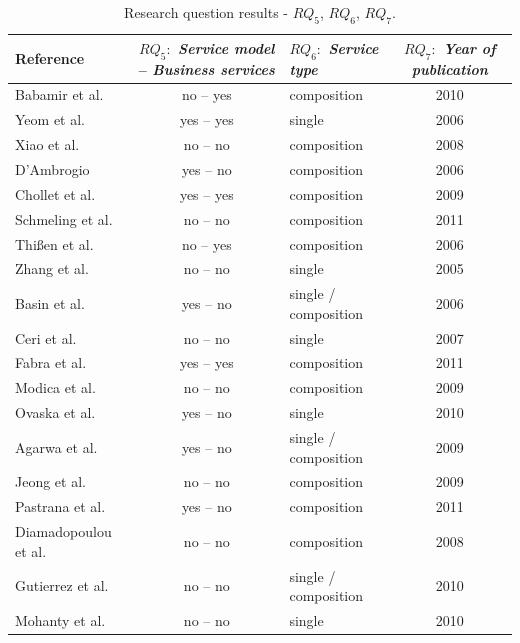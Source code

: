 \begin{table}[ht!]
\centering
\scriptsize
\begin{tabular}{l|c|l|c}
  \hline 
  \hline
   \textbf{Reference} & $RQ_5:$ \textbf{\textit{Service model}} --
   \textbf{\textit{Business services}} &
$RQ_6:$ \textbf{\textit{Service type}} &   $RQ_7:$ \textbf{\textit{Year of publication}} 
   \\
  \hline
  \hline  
  Babamir et al. \cite{Babamir2010} & no -- yes  & composition & 2010   
 \\  
  \hline   
  Yeom et al. \cite{Yeom2006} & yes -- yes & single   & 2006  \\  \hline
  Xiao et al. \cite{XiaoCZBOLH08} & no -- no & composition    & 2008
   \\ 
  \hline 
  D'Ambrogio \cite{DAmbrogio06} & yes  -- no & composition  & 2006 \\
   \hline
  Chollet et al. \cite{CholletL09} & yes -- yes & composition  &  2009 \\
  \hline 
  Schmeling et al. \cite{SchmelingCM11} & no -- no & composition &  2011 \\ 
  \hline
   Thi{\ss}en et al. \cite{ThissenW06} & no -- yes & composition & 2006
   \\
  \hline
  Zhang et al. \cite{ZhangPSP05} & no -- no  & single  & 2005 \\ 
  \hline
  Basin et al. \cite{BasinDL06} & yes -- no & single / composition  & 
  2006\\
  \hline 
  Ceri et al. \cite{CeriDMF07} & no -- no  & single  &  2007\\ 
  \hline 
  Fabra et al. \cite{Fabra2011} & yes -- yes & composition  &  2011\\
  \hline
  Modica et al. \cite{ModicaTV09} & no -- no & composition & 2009\\ 
  \hline
  Ovaska et al. \cite{OvaskaEHPA10} & yes -- no & single & 2010\\
  \hline
  Agarwa et al. \cite{AgarwalLS09} & yes -- no & single / composition  &  
  2009\\
  \hline
  Jeong et al. \cite{JeongCL09} & no -- no  & composition &  2009\\
  \hline
  Pastrana et al. \cite{PastranaPK11} & yes -- no & composition &  2011 \\
  \hline
  Diamadopoulou et al. \cite{DiamadopoulouMPS08} & no -- no & composition 
  & 2008\\
  \hline
  Gutierrez et al. \cite{GutierrezRF10} & no -- no &  single / composition 
  & 2010\\
  \hline
  Mohanty et al. \cite{MohantyRP10} & no -- no  & single  & 2010\\
  \hline
  \hline  
\end{tabular}
\caption{Research question results - $RQ_5$, $RQ_6$, $RQ_7$.}
\label{tab:result03}
\end{table} 

